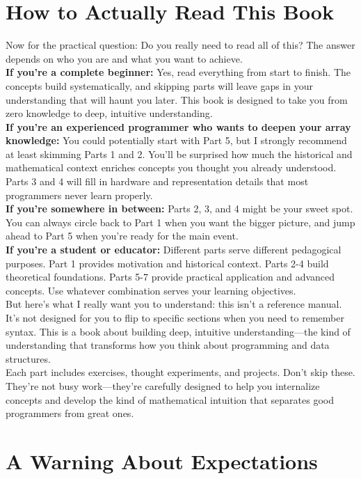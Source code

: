 \section*{How to Actually Read This Book}

Now for the practical question: Do you really need to read all of this? The answer depends on who you are and what you want to achieve.\\
\textbf{If you're a complete beginner:} Yes, read everything from start to finish. The concepts build systematically, and skipping parts will leave gaps in your understanding that will haunt you later. This book is designed to take you from zero knowledge to deep, intuitive understanding.\\
\textbf{If you're an experienced programmer who wants to deepen your array knowledge:} You could potentially start with Part 5, but I strongly recommend at least skimming Parts 1 and 2. You'll be surprised how much the historical and mathematical context enriches concepts you thought you already understood. Parts 3 and 4 will fill in hardware and representation details that most programmers never learn properly.\\
\textbf{If you're somewhere in between:} Parts 2, 3, and 4 might be your sweet spot. You can always circle back to Part 1 when you want the bigger picture, and jump ahead to Part 5 when you're ready for the main event.\\
\textbf{If you're a student or educator:} Different parts serve different pedagogical purposes. Part 1 provides motivation and historical context. Parts 2-4 build theoretical foundations. Parts 5-7 provide practical application and advanced concepts. Use whatever combination serves your learning objectives.\\
But here's what I really want you to understand: this isn't a reference manual. It's not designed for you to flip to specific sections when you need to remember syntax. This is a book about building deep, intuitive understanding—the kind of understanding that transforms how you think about programming and data structures.\\
Each part includes exercises, thought experiments, and projects. Don't skip these. They're not busy work—they're carefully designed to help you internalize concepts and develop the kind of mathematical intuition that separates good programmers from great ones.

\section*{A Warning About Expectations}

